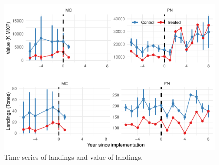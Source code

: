 \documentclass[utf8]{frontiers_suppmat} %
\begin{document}
\begin{figure}
\centering
\includegraphics{SupplementaryMaterial_files/figure-latex/unnamed-chunk-9-1.pdf}
\caption{\label{fig:unnamed-chunk-9}Time series of landings and value of
landings.}
\end{figure}

\clearpage
\end{document}
